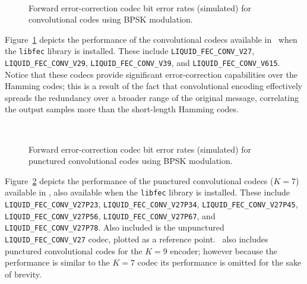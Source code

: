 \begin{figure}
\centering
\mbox{
} \quad
\mbox{
   \quad
}
\caption{Forward error-correction codec bit error rates (simulated)
         for convolutional codes
         using BPSK modulation.}
\label{fig:fec:conv_ber}
\end{figure}
%
Figure~\ref{fig:fec:conv_ber} depicts the performance of the
convolutional codecs available in \liquid\ when the {\tt libfec} library
is installed.
These include
{\tt LIQUID\_FEC\_CONV\_V27},
{\tt LIQUID\_FEC\_CONV\_V29},
{\tt LIQUID\_FEC\_CONV\_V39}, and
{\tt LIQUID\_FEC\_CONV\_V615}.
Notice that these codecs provide significant error-correction
capabilities over the Hamming codes;
this is a result of the fact that convolutional encoding effectively
spreads the redundancy over a broader range of the original message,
correlating the output samples more than the short-length Hamming codes.


\begin{figure}
\centering
\mbox{
} \quad
\mbox{
   \quad
}
\caption{Forward error-correction codec bit error rates (simulated)
         for punctured convolutional codes
         using BPSK modulation.}
\label{fig:fec:convpunc_ber}
\end{figure}
%
Figure~\ref{fig:fec:convpunc_ber} depicts the performance of the
punctured convolutional codecs ($K=7$) available in \liquid,
also available when the {\tt libfec} library is installed.
These include
{\tt LIQUID\_FEC\_CONV\_V27P23},
{\tt LIQUID\_FEC\_CONV\_V27P34},
{\tt LIQUID\_FEC\_CONV\_V27P45},
{\tt LIQUID\_FEC\_CONV\_V27P56},
{\tt LIQUID\_FEC\_CONV\_V27P67}, and
{\tt LIQUID\_FEC\_CONV\_V27P78}.
Also included is the unpunctured {\tt LIQUID\_FEC\_CONV\_V27} codec,
plotted as a reference point.
\liquid\ also includes punctured convolutional codes for the $K=9$
encoder;
however because the performance is similar to the $K=7$ codec
its performance is omitted for the sake of brevity.


